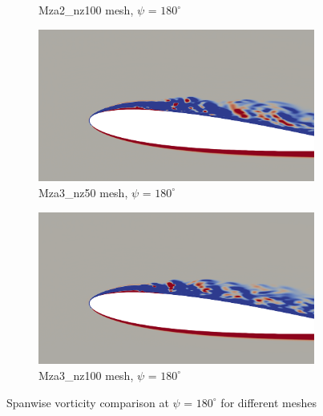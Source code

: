 \begin{figure}[H]
\begin{subfigure}[b]{0.475\textwidth}
		\caption{Mza2\_nz100 mesh, $\psi$ = $180^\circ$}
		\label{fig:Mza2_100_sp_psi180}
	\end{subfigure}
	\begin{subfigure}[b]{0.475\textwidth}
	\centering
	\includegraphics[width=1\textwidth]{figures/zonal_adapt_results/vorticity_plots/v2/Mza3_50/spavg/phase_180.png}
	\caption{Mza3\_nz50 mesh, $\psi$ = $180^\circ$}
	\label{fig:Mza3_50_sp_psi180}
	\end{subfigure}
	\begin{subfigure}[b]{0.475\textwidth}
		\centering
		\includegraphics[width=1\textwidth]{figures/zonal_adapt_results/vorticity_plots/v2/Mza3_100/spavg/phase_180.png}
		\caption{Mza3\_nz100 mesh, $\psi$ = $180^\circ$}
		\label{fig:Mza3_100_sp_psi180}
	\end{subfigure}
	\caption{Spanwise vorticity comparison at $\psi$ = $180^\circ$ for different meshes}
	\label{fig:vorticity_zonal_180}
\end{figure}



